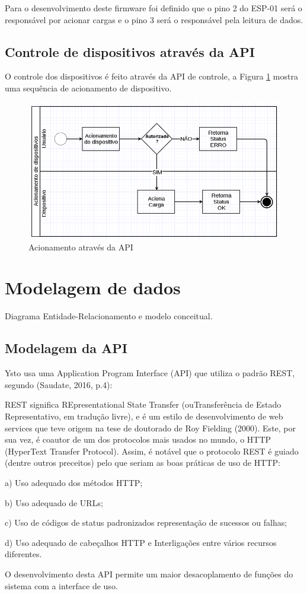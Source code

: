 Para o desenvolvimento deste firmware foi definido que o pino 2 do ESP-01 será o responsável por acionar cargas e o pino 3 será o responsável pela leitura de dados.

\subsection{Controle de dispositivos através da API}
O controle dos dispositivos é feito através da API de controle, a Figura \ref{api-acionamento} mostra uma sequência de acionamento de dispositivo.

\begin{figure}[H]
\caption{\label{api-acionamento} Acionamento através da API}
\includegraphics[scale=0.5]{img/acionamento-api.png}
\end{figure}

\section{Modelagem de dados}
Diagrama Entidade-Relacionamento e modelo conceitual.

\subsection{Modelagem da API}
Ysto usa uma Application Program Interface (API) que utiliza o padrão REST, segundo (Saudate, 2016, p.4):

\begin{citacao}
REST significa REpresentational State Transfer (ouTransferência de Estado Representativo, em tradução livre), e é um estilo de desenvolvimento de web services que teve origem na tese de doutorado de Roy Fielding (2000). Este, por sua vez, é coautor de um dos protocolos mais usados no mundo, o HTTP (HyperText Transfer Protocol). Assim, é notável que o protocolo REST é guiado (dentre outros preceitos) pelo que seriam as boas práticas de uso de HTTP:

a) Uso adequado dos métodos HTTP;

b) Uso adequado de URLs;

c) Uso de códigos de status padronizados representação de sucessos ou falhas;

d) Uso adequado de cabeçalhos HTTP e Interligações entre vários recursos diferentes.

O desenvolvimento desta API permite um maior desacoplamento de funções do sistema com a interface de uso.
\end{citacao}

